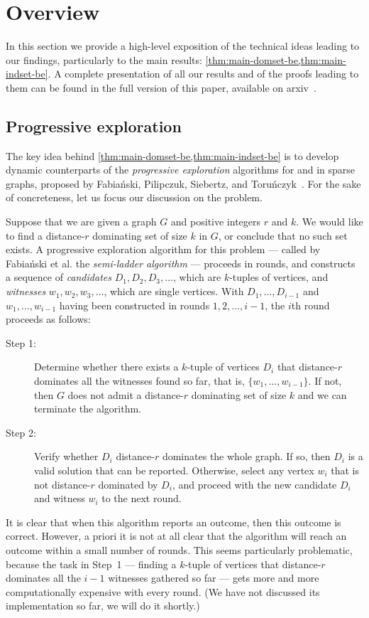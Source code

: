 \section{Overview}\label{sec:overview}

In this section we provide a high-level exposition of the technical ideas leading to our findings, particularly to the main results: \cref{thm:main-domset-be,thm:main-indset-be}. A complete presentation of all our results and of the proofs leading to them can be found in the full version of this paper, available on arxiv~\cite{ourArxiv}.

\subsection{Progressive exploration}

The key idea behind \cref{thm:main-domset-be,thm:main-indset-be} is to develop dynamic counterparts of the \emph{progressive exploration} algorithms for  and  in sparse graphs, proposed by Fabia\'nski, Pilipczuk, Siebertz, and Toru\'nczyk~\cite{FabianskiPST19}. For the sake of concreteness, let us focus our discussion on the  problem.

Suppose that we are given a graph $G$ and positive integers $r$ and $k$. We would like to find a distance-$r$ dominating set of size $k$ in $G$, or conclude that no such set exists. A progressive exploration algorithm for this problem --- called by Fabia\'nski et al. the \emph{semi-ladder algorithm} --- proceeds in rounds, and constructs a sequence of \emph{candidates} $D_1,D_2,D_3,\ldots$, which are $k$-tuples of vertices, and \emph{witnesses} $w_1,w_2,w_3,\ldots$, which are single vertices. With $D_1,\ldots,D_{i-1}$ and $w_1,\ldots,w_{i-1}$ having been constructed in rounds $1,2,\ldots,i-1$, the $i$th round proceeds as follows:
\begin{description}
	\item[Step 1:] Determine whether there exists a $k$-tuple of vertices $D_i$ that distance-$r$ dominates all the witnesses found so far, that is, $\{w_1,\ldots,w_{i-1}\}$. If not, then $G$ does not admit a distance-$r$ dominating set of size $k$ and we can terminate the algorithm.
	\item[Step 2:] Verify whether $D_i$ distance-$r$ dominates the whole graph. If so, then $D_i$ is a valid solution that can be reported. Otherwise, select any vertex $w_i$ that is not distance-$r$ dominated by $D_i$, and proceed with the new candidate $D_i$ and witness $w_i$ to the next round.
\end{description}
It is clear that when this algorithm reports an outcome, then this outcome is correct. However, a priori it is not at all clear that the algorithm will reach an outcome within a small number of rounds. This seems particularly problematic, because the task  in Step~1 --- finding a $k$-tuple of vertices that distance-$r$ dominates all the $i-1$ witnesses gathered so far --- gets more and more computationally expensive with every round. (We have not discussed its implementation so far, we will do it shortly.)

